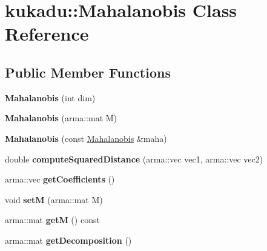 \hypertarget{classkukadu_1_1Mahalanobis}{}\section{kukadu\+:\+:Mahalanobis Class Reference}
\label{classkukadu_1_1Mahalanobis}
\subsection*{Public Member Functions}
\begin{DoxyCompactItemize}
\item 
{\bfseries Mahalanobis} (int dim)\hypertarget{classkukadu_1_1Mahalanobis_a15f47cbf891794a56efda7d108fbd7ec}{}\label{classkukadu_1_1Mahalanobis_a15f47cbf891794a56efda7d108fbd7ec}

\item 
{\bfseries Mahalanobis} (arma\+::mat M)\hypertarget{classkukadu_1_1Mahalanobis_a88c4934e79958652ed59fe146c387980}{}\label{classkukadu_1_1Mahalanobis_a88c4934e79958652ed59fe146c387980}

\item 
{\bfseries Mahalanobis} (const \hyperlink{classkukadu_1_1Mahalanobis}{Mahalanobis} \&maha)\hypertarget{classkukadu_1_1Mahalanobis_a1a6e0cb4e5ae21e69b719bf4352ebaf7}{}\label{classkukadu_1_1Mahalanobis_a1a6e0cb4e5ae21e69b719bf4352ebaf7}

\item 
double {\bfseries compute\+Squared\+Distance} (arma\+::vec vec1, arma\+::vec vec2)\hypertarget{classkukadu_1_1Mahalanobis_a4908373882185f929f90910496d0be46}{}\label{classkukadu_1_1Mahalanobis_a4908373882185f929f90910496d0be46}

\item 
arma\+::vec {\bfseries get\+Coefficients} ()\hypertarget{classkukadu_1_1Mahalanobis_ab5215c5132db0326d6cdcebca8d4473f}{}\label{classkukadu_1_1Mahalanobis_ab5215c5132db0326d6cdcebca8d4473f}

\item 
void {\bfseries setM} (arma\+::mat M)\hypertarget{classkukadu_1_1Mahalanobis_afc94f534bc63e0ff416d69a51b4b9c6f}{}\label{classkukadu_1_1Mahalanobis_afc94f534bc63e0ff416d69a51b4b9c6f}

\item 
arma\+::mat {\bfseries getM} () const \hypertarget{classkukadu_1_1Mahalanobis_a6a6db9d96a3b59c9129434a71223f3e1}{}\label{classkukadu_1_1Mahalanobis_a6a6db9d96a3b59c9129434a71223f3e1}

\item 
arma\+::mat {\bfseries get\+Decomposition} ()\hypertarget{classkukadu_1_1Mahalanobis_a65b487f0373df5c13dee4826e379fdff}{}\label{classkukadu_1_1Mahalanobis_a65b487f0373df5c13dee4826e379fdff}

\end{DoxyCompactItemize}


